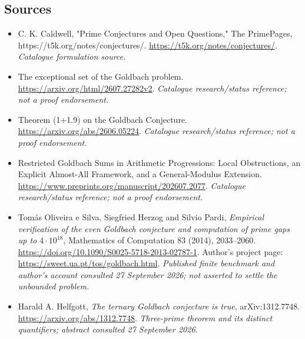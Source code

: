 \documentclass[11pt,a4paper]{article}
\numberwithin{equation}{section}
\begin{document}

\subsection{Sources}
\begin{itemize}\raggedright
\item[\textnormal{[S1]}]\hypertarget{source:12:1}{} C. K. Caldwell, "Prime Conjectures and Open Questions," The PrimePages, https://t5k.org/notes/conjectures/.
\url{https://t5k.org/notes/conjectures/}.
{\small\textit{Catalogue formulation source.}}
\item[\textnormal{[S2]}]\hypertarget{source:12:2}{} The exceptional set of the Goldbach problem.
\url{https://arxiv.org/html/2607.27282v2}.
{\small\textit{Catalogue research/status reference; not a proof endorsement.}}
\item[\textnormal{[S3]}]\hypertarget{source:12:3}{} Theorem (1+1.9) on the Goldbach Conjecture.
\url{https://arxiv.org/abs/2606.05224}.
{\small\textit{Catalogue research/status reference; not a proof endorsement.}}
\item[\textnormal{[S4]}]\hypertarget{source:12:4}{} Restricted Goldbach Sums in Arithmetic Progressions: Local Obstructions, an Explicit Almost-All Framework, and a General-Modulus Extension.
\url{https://www.preprints.org/manuscript/202607.2077}.
{\small\textit{Catalogue research/status reference; not a proof endorsement.}}
\item[\textnormal{[E1]}]\hypertarget{extra:12:1}{} Tom\'as Oliveira e Silva,
Siegfried Herzog and Silvio Pardi, \emph{Empirical verification of the even
Goldbach conjecture and computation of prime gaps up to $4\cdot10^{18}$},
Mathematics of Computation 83 (2014), 2033--2060.
\url{https://doi.org/10.1090/S0025-5718-2013-02787-1}.
Author's project page: \url{https://sweet.ua.pt/tos/goldbach.html}.
{\small\textit{Published finite benchmark and author's account consulted
27 September 2026; not asserted to settle the unbounded problem.}}
\item[\textnormal{[E2]}]\hypertarget{extra:12:2}{} Harald A. Helfgott,
\emph{The ternary Goldbach conjecture is true}, arXiv:1312.7748.
\url{https://arxiv.org/abs/1312.7748}.
{\small\textit{Three-prime theorem and its distinct quantifiers;
abstract consulted 27 September 2026.}}

\end{itemize}

\end{document}
